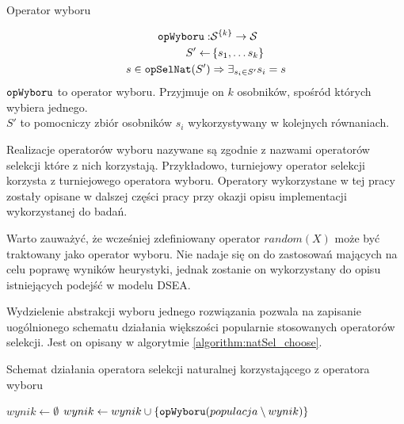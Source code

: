 \documentclass[./FM_mgr.tex]{subfiles}
\begin{document}
\begin{signature}
	\caption{Operator wyboru \label{signature:chooseOp}}
	\begin{align}
	\mathtt{opWyboru}: &{\mathcal{S}}^{ \{ k \}} \rightarrow \mathcal{S} \\
	S' \gets &\left\{ s_1, \ldots s_k \right\} \\
	s \in \mathtt{opSelNat}(S') &\Rightarrow \exists_{s_i \in S'}  s_i = s
	\end{align}
	$\mathtt{opWyboru}$ to operator wyboru.
	Przyjmuje on $k$ osobników, spośród których wybiera jednego. \\
	$S'$ to pomocniczy zbiór osobników $s_i$ wykorzystywany w kolejnych równaniach.
\end{signature}

Realizacje operatorów wyboru nazywane są zgodnie z nazwami operatorów selekcji które z nich korzystają.
Przykładowo, turniejowy operator selekcji korzysta z turniejowego operatora wyboru.
Operatory wykorzystane w tej pracy zostały opisane w dalszej części pracy przy okazji opisu implementacji wykorzystanej do badań.

Warto zauważyć, że wcześniej zdefiniowany operator $random(X)$ może być traktowany jako operator wyboru.
Nie nadaje się on do zastosowań mających na celu poprawę wyników heurystyki, jednak zostanie on wykorzystany do opisu istniejących podejść w modelu DSEA.

Wydzielenie abstrakcji wyboru jednego rozwiązania pozwala na zapisanie uogólnionego schematu działania większości popularnie stosowanych operatorów selekcji.
Jest on opisany w algorytmie \ref{algorithm:natSel_choose}.

\begin{algorithm}[h]
	\caption{Schemat działania operatora selekcji naturalnej korzystającego z operatora wyboru \label{algorithm:natSel_choose}}
	\begin{algorithmic}[1]
		\Start
		\Var $wynik \gets \emptyset$ 
		\label{line:natSelChoose_init}
		\label{line:natSelChoose_while}
		\State $wynik \gets wynik \cup \{ \mathtt{opWyboru}(populacja \setminus wynik) \}$
		\label{line:natSelChoose_choose}
		\EndWhile
		\State {}
		\label{line:natSelChoose_return}
		\EndOperator
	\end{algorithmic}
\end{algorithm}
\end{document}
